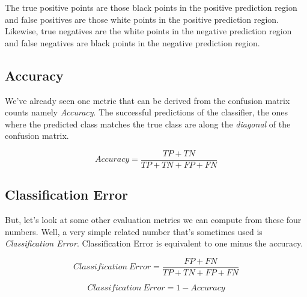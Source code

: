 \begin{multicols}{2}
The true positive points are those black points in the positive prediction region and false positives are those white points in the positive prediction region. Likewise, true negatives are the white points in the negative prediction region and false negatives are black points in the negative prediction region. 

\subsection{Accuracy}

We've already seen one metric that can be derived from the confusion matrix counts namely \emph{Accuracy}. The successful predictions of the classifier, the ones where the predicted class matches the true class are along the \emph{diagonal} of the confusion matrix. 

$$Accuracy = \frac{TP + TN}{TP + TN + FP + FN}$$

\subsection{Classification Error}

But, let's look at some other evaluation metrics we can compute from these four numbers. Well, a very simple related number that's sometimes used is \emph{Classification Error}. Classification Error is equivalent to  one minus the accuracy.

$$Classification\ Error = \frac{FP + FN}{TP + TN + FP + FN}$$

$$Classification\ Error = 1 - Accuracy$$


\end{multicols}
